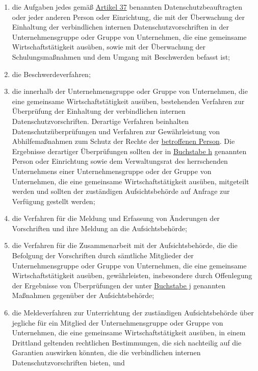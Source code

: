 \begin{enumerate}
\begin{enumerate}
    \item die Aufgaben jedes gemäß \hyperref[ch:37]{Artikel 37} benannten Datenschutzbeauftragten oder jeder anderen
     Person oder Einrichtung, die mit der Überwachung der Einhaltung der verbindlichen internen Datenschutzvorschriften
     in der Unternehmensgruppe oder Gruppe von Unternehmen, die eine gemeinsame Wirtschaftstätigkeit ausüben, sowie mit
     der Überwachung der Schulungsmaßnahmen und dem Umgang mit Beschwerden befasst ist;
    \label{itm:47-2h}

    \item die Beschwerdeverfahren;
    \label{itm:47-2i}

    \item die innerhalb der Unternehmensgruppe oder Gruppe von Unternehmen, die eine gemeinsame Wirtschaftstätigkeit
     ausüben, bestehenden Verfahren zur Überprüfung der Einhaltung der verbindlichen internen Datenschutzvorschriften.
     Derartige Verfahren beinhalten Datenschutzüberprüfungen und Verfahren zur Gewährleistung von Abhilfemaßnahmen zum
     Schutz der Rechte der \hyperref[itm:04-1]{betroffenen Person}. Die Ergebnisse derartiger Überprüfungen sollten der in \hyperref
     [itm:47-2h]{Buchstabe h} genannten Person oder Einrichtung sowie dem Verwaltungsrat des herrschenden Unternehmens
     einer Unternehmensgruppe oder der Gruppe von Unternehmen, die eine gemeinsame Wirtschaftstätigkeit ausüben,
     mitgeteilt werden und sollten der zuständigen Aufsichtsbehörde auf Anfrage zur Verfügung gestellt werden;
    \label{itm:47-2j}

    \item die Verfahren für die Meldung und Erfassung von Änderungen der Vorschriften und ihre Meldung an die
     Aufsichtsbehörde;
    \label{itm:47-2k}

    \item die Verfahren für die Zusammenarbeit mit der Aufsichtsbehörde, die die Befolgung der Vorschriften durch
     sämtliche Mitglieder der Unternehmensgruppe oder Gruppe von Unternehmen, die eine gemeinsame Wirtschaftstätigkeit
     ausüben, gewährleisten, insbesondere durch Offenlegung der Ergebnisse von Überprüfungen der unter \hyperref
     [itm:47-2j]{Buchstabe j} genannten Maßnahmen gegenüber der Aufsichtsbehörde;
    \label{itm:47-2l}

    \item die Meldeverfahren zur Unterrichtung der zuständigen Aufsichtsbehörde über jegliche für ein Mitglied der
     Unternehmensgruppe oder Gruppe von Unternehmen, die eine gemeinsame Wirtschaftstätigkeit ausüben, in einem
     Drittland geltenden rechtlichen Bestimmungen, die sich nachteilig auf die Garantien auswirken könnten, die die
     verbindlichen internen Datenschutzvorschriften bieten, und
    \label{itm:47-2m}


\end{enumerate}
\end{enumerate}
